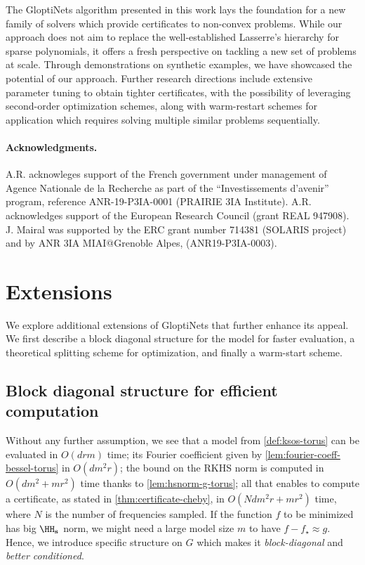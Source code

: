 \documentclass{article}
\begin{document}
The GloptiNets algorithm presented in this work lays the foundation for a new family of solvers which provide certificates to non-convex problems. While our approach does not aim to replace the well-established Lasserre's hierarchy for sparse polynomials, it offers a fresh perspective on tackling a new set of problems at scale. Through demonstrations on synthetic examples, we have showcased the potential of our approach. Further research directions include extensive parameter tuning to obtain tighter certificates, with the possibility of leveraging second-order optimization schemes, along with warm-restart schemes for application which requires solving multiple similar problems sequentially.

\paragraph{Acknowledgments.}{
  A.R. acknowleges support of the French government under management of Agence Nationale de la Recherche as part of the ``Investissements d'avenir'' program, reference ANR-19-P3IA-0001 (PRAIRIE 3IA Institute). A.R. acknowledges support of the European Research Council (grant REAL 947908).  J. Mairal was supported by the ERC grant number 714381 (SOLARIS project) and by ANR 3IA MIAI@Grenoble Alpes, (ANR19-P3IA-0003).
}




\newpage

\appendix

\section{Extensions}
\label{sec:extensions}

We explore additional extensions of GloptiNets that further enhance its appeal. We first describe a block diagonal structure for the model for faster evaluation, a theoretical splitting scheme for optimization, and finally a warm-start scheme.

\subsection{Block diagonal structure for efficient computation}

Without any further assumption, we see that a model from \cref{def:ksos-torus} can be evaluated in $O(drm)$ time; its Fourier coefficient given by \cref{lem:fourier-coeff-bessel-torus} in $O(d m^2 r)$; the bound on the RKHS norm is computed in $O(d m^2 + m r^2)$ time thanks to \cref{lem:hsnorm-g-torus}; all that enables to compute a certificate, as stated in \cref{thm:certificate-cheby}, in $O(N d m^2 r + m r^2)$ time, where $N$ is the number of frequencies sampled. If the function $f$ to be minimized has big $\HH_\mathbf{s}$ norm, we might need a large model size $m$ to have $f - f_\star \approx g$. Hence, we introduce specific structure on $G$ which makes it \emph{block-diagonal} and \emph{better conditioned}.
\end{document}

